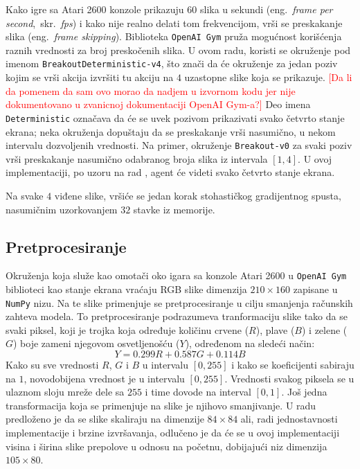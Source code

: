 \par 
Kako igre sa Atari 2600 konzole prikazuju $60$ slika u sekundi (eng.~{\em frame per second},~skr.~{\em fps}) i kako nije realno delati tom frekvencijom, vrši se preskakanje slika (eng.~{\em frame skipping}). Biblioteka \texttt{OpenAI Gym} pruža mogućnost korišćenja raznih vrednosti za broj preskočenih slika. U ovom radu, koristi se okruženje pod imenom \texttt{BreakoutDeterministic-v4}, što znači da će okruženje za jedan poziv kojim se vrši akcija izvršiti tu akciju na $4$ uzastopne slike koja se prikazuje. \textcolor{red}{[Da li da pomenem da sam ovo morao da nadjem u izvornom kodu jer nije dokumentovano u zvanicnoj dokumentaciji OpenAI Gym-a?]} Deo imena \texttt{Deterministic} označava da će se uvek pozivom prikazivati svako četvrto stanje ekrana; neka okruženja dopuštaju da se preskakanje vrši nasumično, u nekom intervalu dozvoljenih vrednosti. Na primer, okruženje \texttt{Breakout-v0} za svaki poziv vrši preskakanje nasumično odabranog broja slika iz intervala $[1,4]$. U ovoj implementaciji, po uzoru na rad \cite{dqn_dm}, agent će videti svako četvrto stanje ekrana. 
\par 
Na svake $4$ viđene slike, vršiće se jedan korak stohastičkog gradijentnog spusta, nasumičnim uzorkovanjem $32$ stavke iz memorije.

\subsection{Pretprocesiranje}
\label{ss:pretprocesiranje}
Okruženja koja služe kao omotači oko igara sa konzole Atari 2600 u \texttt{OpenAI Gym} biblioteci kao stanje ekrana vraćaju RGB slike dimenzija $210 \times 160$ zapisane u \texttt{NumPy} nizu. Na te slike primenjuje se pretprocesiranje u cilju smanjenja računskih zahteva modela. To pretprocesiranje podrazumeva tranformaciju slike tako da se svaki piksel, koji je trojka koja određuje količinu crvene ($R$), plave ($B$) i zelene ($G$) boje zameni njegovom osvetljenošću ($Y$), određenom na sledeći način:
\begin{equation}
\label{eq:lum}
	Y = 0.299 R + 0.587 G + 0.114 B
\end{equation}
Kako su sve vrednosti $R$, $G$ i $B$ u intervalu $[0, 255]$ i kako se koeficijenti sabiraju na $1$, novodobijena vrednost je u intervalu $[0, 255]$. Vrednosti svakog piksela se u ulaznom sloju mreže dele sa $255$ i time dovode na interval $[0, 1]$. Još jedna transformacija koja se primenjuje na slike je njihovo smanjivanje. U radu \cite{dqn_dm} predloženo je da se slike skaliraju na dimenzije $84 \times 84$ ali, radi jednostavnosti implementacije i brzine izvršavanja, odlučeno je da će se u ovoj implementaciji visina i širina slike prepolove u odnosu na početnu, dobijajući niz dimenzija $105 \times 80$.

